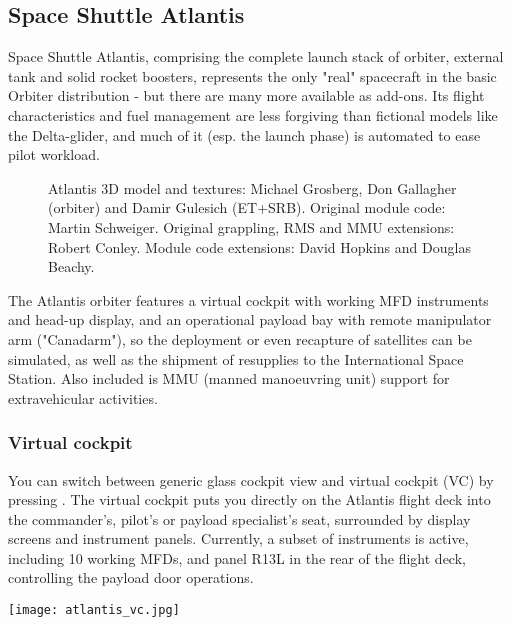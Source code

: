 \documentclass[Orbiter User Manual.tex]{subfiles}
\begin{document}
\subsection{Space Shuttle Atlantis}
Space Shuttle Atlantis, comprising the complete launch stack of orbiter, external tank and solid rocket boosters, represents the only "real" spacecraft in the basic Orbiter distribution - but there are many more available as add-ons. Its flight characteristics and fuel management are less forgiving than fictional models like the Delta-glider, and much of it (esp. the launch phase) is automated to ease pilot workload.


\begin{figure}[H]
	\centering
	\caption{Atlantis 3D model and textures: Michael Grosberg, Don Gallagher (orbiter) and Damir Gulesich (ET+SRB). Original module code: Martin Schweiger. Original grappling, RMS and MMU extensions: Robert Conley. Module code extensions: David Hopkins and Douglas Beachy.}
\end{figure}

\noindent
The Atlantis orbiter features a virtual cockpit with working MFD instruments and head-up display, and an operational payload bay with remote manipulator arm ("Canadarm"), so the deployment or even recapture of satellites can be simulated, as well as the shipment of resupplies to the International Space Station. Also included is MMU (manned manoeuvring unit) support for extravehicular activities.


\subsubsection{Virtual cockpit}
You can switch between generic glass cockpit view and virtual cockpit (VC) by pressing . The virtual cockpit puts you directly on the Atlantis flight deck into the commander's, pilot's or payload specialist's seat, surrounded by display screens and instrument panels. Currently, a subset of instruments is active, including 10 working MFDs, and panel R13L in the rear of the flight deck, controlling the payload door operations.

\begin{center}
\texttt{[image: atlantis\_vc.jpg]}
\end{center}
\end{document}
